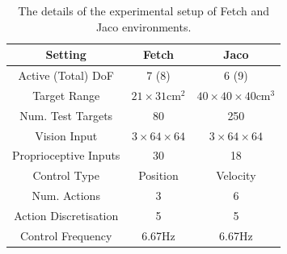 \begin{table}[h!]
  \centering
  \begin{tabular}{c|cc}
    \toprule
    Setting & Fetch & Jaco \\
    \midrule
    Active (Total) DoF & 7 (8) & 6 (9) \\
    Target Range & $21 \times 31 \text{cm}^2$ & $40 \times 40 \times 40 \text{cm}^3$ \\
    Num. Test Targets & 80 & 250 \\
    Vision Input & $3 \times 64 \times 64$ & $3 \times 64 \times 64$ \\
    Proprioceptive Inputs & 30 & 18 \\
    Control Type & Position & Velocity \\
    Num. Actions & 3 & 6 \\
    Action Discretisation & 5 & 5 \\
    Control Frequency & 6.67Hz & 6.67Hz \\
    \bottomrule
  \end{tabular}
  \caption{The details of the experimental setup of Fetch and Jaco environments.}
  \label{tbl:exp_setup}
\end{table}

